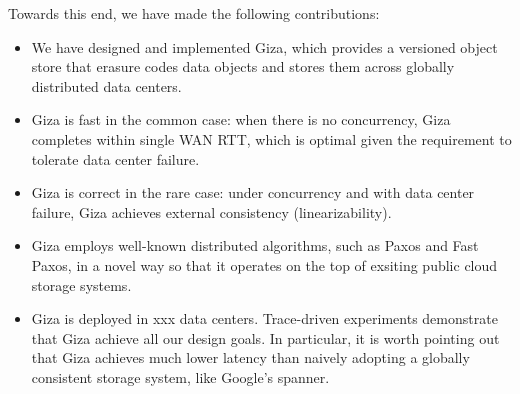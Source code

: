 Towards this end, we have made the following contributions:
\begin{itemize}
    \item We have designed and implemented Giza, which provides a versioned object store that erasure codes data objects and stores them across globally distributed data centers.
    \item Giza is fast in the common case: when there is no concurrency, Giza completes within single WAN RTT, which is optimal given the requirement to tolerate data center failure.
    \item Giza is correct in the rare case: under concurrency and with data center failure, Giza achieves external consistency (linearizability).
    \item Giza employs well-known distributed algorithms, such as Paxos and Fast Paxos, in a novel way so that it operates on the top of exsiting public cloud storage systems.
    \item Giza is deployed in xxx data centers. Trace-driven experiments demonstrate that Giza achieve all our design goals. In particular, it is worth pointing out that Giza achieves much lower latency than naively adopting a globally consistent storage system, like Google's spanner.
\end{itemize}
